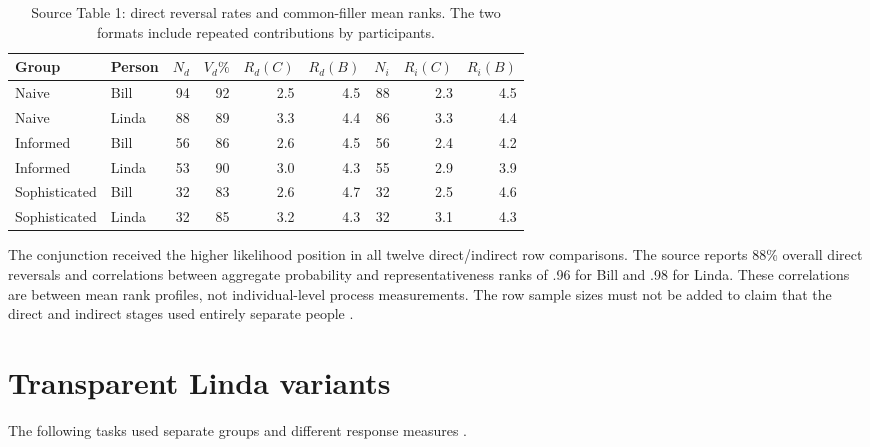 \begin{table}[htbp]
\centering\small
\setlength{\tabcolsep}{3pt}
\begin{tabular}{llrrrrrrr}
\hline
Group & Person & \(N_d\) & \(V_d\%\) & \(R_d(C)\) & \(R_d(B)\)
      & \(N_i\) & \(R_i(C)\) & \(R_i(B)\)\\
\hline
Naive & Bill & 94 & 92 & 2.5 & 4.5 & 88 & 2.3 & 4.5\\
Naive & Linda & 88 & 89 & 3.3 & 4.4 & 86 & 3.3 & 4.4\\
Informed & Bill & 56 & 86 & 2.6 & 4.5 & 56 & 2.4 & 4.2\\
Informed & Linda & 53 & 90 & 3.0 & 4.3 & 55 & 2.9 & 3.9\\
Sophisticated & Bill & 32 & 83 & 2.6 & 4.7 & 32 & 2.5 & 4.6\\
Sophisticated & Linda & 32 & 85 & 3.2 & 4.3 & 32 & 3.1 & 4.3\\
\hline
\end{tabular}
\caption{Source Table 1: direct reversal rates and common-filler mean ranks.
The two formats include repeated contributions by participants.}
\label{tab:p19-conjunction-ranks}
\end{table}

The conjunction received the higher likelihood position in all twelve
direct/indirect row comparisons. The source reports 88\% overall direct
reversals and correlations between aggregate probability and
representativeness ranks of .96 for Bill and .98 for Linda.
These correlations are between mean rank profiles, not individual-level
process measurements. The row sample sizes must not be added to claim
that the direct and indirect stages used entirely separate people
\cite[p.~298]{TverskyKahneman1983Conjunction}.

\section{Transparent Linda variants}
\label{sec:p19-conjunction-transparent}

The following tasks used separate groups and different response measures
\cite[pp.~299--300]{TverskyKahneman1983Conjunction}.

